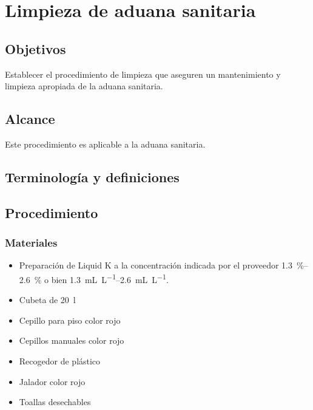 \thispagestyle{formato-PI}
\renewcommand{\MayorVer}{2}
\renewcommand{\MenorVer}{0}
\renewcommand{\Codigo}{HYS-7-IT}
\renewcommand{\FechaPub}{2023--01}
\renewcommand{\Titulo}{Limpieza de aduana sanitaria}

\section{\Titulo}

\subsection{Objetivos}
Establecer el procedimiento de limpieza que aseguren un mantenimiento y limpieza apropiada de la aduana sanitaria.

\subsection{Alcance}
Este procedimiento es aplicable a la aduana sanitaria.

\subsection{Terminología y definiciones}
\begin{description}
\end{description}

\subsection{Procedimiento}
\subsubsection{Materiales}

\begin{itemize}
	\item Preparación de Liquid K a la concentración indicada por el proveedor \qtyrange{1.3}{2.6}{\percent} o bien \qtyrange{1.3}{2.6}{\milli\liter\per\liter}.
	\item Cubeta de \qty{20}{\litre}
	\item Cepillo para piso color rojo
	\item Cepillos manuales color rojo
	\item Recogedor de plástico
	\item Jalador color rojo
	\item Toallas desechables
\end{itemize}

